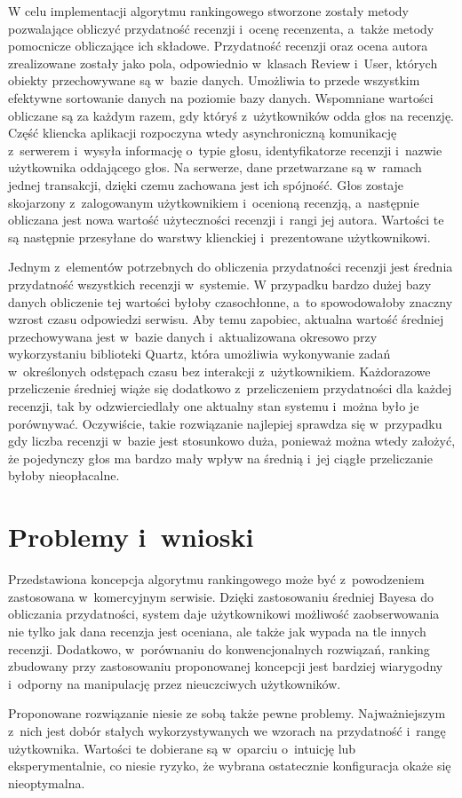 W celu implementacji algorytmu rankingowego stworzone zostały metody pozwalające obliczyć przydatność recenzji i~ocenę recenzenta, a~także metody pomocnicze obliczające ich składowe. Przydatność recenzji oraz ocena autora zrealizowane zostały jako pola, odpowiednio w~klasach Review i~User, których obiekty przechowywane są w~bazie danych. Umożliwia to przede wszystkim efektywne sortowanie danych na poziomie bazy danych. Wspomniane wartości obliczane są za każdym razem, gdy któryś z~użytkowników odda głos na recenzję. Część kliencka aplikacji rozpoczyna wtedy asynchroniczną komunikację z~serwerem i~wysyła informację o~typie głosu, identyfikatorze recenzji i~nazwie użytkownika oddającego głos. Na serwerze, dane przetwarzane są w~ramach jednej transakcji\cite{springAction}, dzięki czemu zachowana jest ich spójność. Głos zostaje skojarzony z~zalogowanym użytkownikiem i~ocenioną recenzją, a~następnie obliczana jest nowa wartość użyteczności recenzji i~rangi jej autora. Wartości te są następnie przesyłane do warstwy klienckiej i~prezentowane użytkownikowi.

Jednym z~elementów potrzebnych do obliczenia przydatności recenzji jest średnia przydatność wszystkich recenzji w~systemie. W przypadku bardzo dużej bazy danych obliczenie tej wartości byłoby czasochłonne, a~to spowodowałoby znaczny wzrost czasu odpowiedzi serwisu. Aby temu zapobiec, aktualna wartość średniej przechowywana jest w~bazie danych i~aktualizowana okresowo przy wykorzystaniu biblioteki Quartz, która umożliwia wykonywanie zadań w~określonych odstępach czasu bez interakcji z~użytkownikiem.\cite{quartz} Każdorazowe przeliczenie średniej wiąże się dodatkowo z~przeliczeniem przydatności dla każdej recenzji, tak by odzwierciedlały one aktualny stan systemu i~można było je porównywać. Oczywiście, takie rozwiązanie najlepiej sprawdza się w~przypadku gdy liczba  recenzji w~bazie jest stosunkowo duża, ponieważ można wtedy założyć, że pojedynczy głos ma bardzo mały wpływ na średnią i~jej ciągłe przeliczanie byłoby nieopłacalne.

\section{Problemy i~wnioski}

Przedstawiona koncepcja algorytmu rankingowego może być z~powodzeniem zastosowana w~komercyjnym serwisie. Dzięki zastosowaniu średniej Bayesa do obliczania przydatności, system daje użytkownikowi możliwość zaobserwowania nie tylko jak dana recenzja jest oceniana, ale także jak wypada na tle innych recenzji. Dodatkowo, w~porównaniu do konwencjonalnych rozwiązań, ranking zbudowany przy zastosowaniu proponowanej koncepcji jest bardziej wiarygodny i~odporny na manipulację przez nieuczciwych użytkowników.

Proponowane rozwiązanie niesie ze sobą także pewne problemy. Najważniejszym z~nich jest dobór stałych wykorzystywanych we wzorach na przydatność i~rangę użytkownika. Wartości te dobierane są w~oparciu o~intuicję lub eksperymentalnie, co niesie ryzyko, że wybrana ostatecznie konfiguracja okaże się nieoptymalna.
